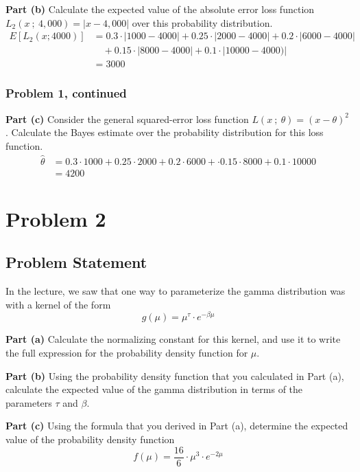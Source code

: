 \documentclass[12pt]{article}
\theoremstyle{definition}
\begin{document}
\vspace{1.5in}
\noindent
{\bf Part (b)} Calculate the expected value of the absolute error loss function $L_2(x\ ;\ 4,000) = |x - 4,000|$ over this probability distribution.
\begin{align*}
E[L_2(x;4000)] &= 0.3 \cdot |1000 - 4000| + 0.25 \cdot |2000 - 4000| + 0.2 \cdot |6000 - 4000|\\
&\quad + 0.15 \cdot |8000 - 4000| + 0.1 \cdot |10000 - 4000)|\\
&= 3000
\end{align*}

\newpage
\subsubsection*{Problem 1, continued}

\noindent
{\bf Part (c)} Consider the general squared-error loss function $L(x\ ;\ \theta) = (x - \theta)^2$. Calculate the Bayes estimate over the probability distribution for this loss function.
\begin{align*}
\hat{\theta} &= 0.3 \cdot 1000 + 0.25 \cdot 2000 + 0.2 \cdot 6000 + \cdot 0.15 \cdot 8000 + 0.1 \cdot 10000\\
&= 4200
\end{align*}

\newpage
\section*{Problem 2}

\subsection*{Problem Statement}

In the lecture, we saw that one way to parameterize the gamma distribution was with a kernel of the form
$$
g(\mu) = \mu^\tau \cdot e^{-\beta \mu}
$$

\bigskip
\noindent
{\bf Part (a)} Calculate the normalizing constant for this kernel, and use it to write the full expression for the probability density function for $\mu$.

\bigskip
\noindent
{\bf Part (b)} Using the probability density function that you calculated in Part (a), calculate the expected value of the gamma distribution in terms of the parameters $\tau$ and $\beta$.

\bigskip
\noindent
{\bf Part (c)} Using the formula that you derived in Part (a), determine the expected value of the probability density function
$$
f(\mu) = \frac{16}{6} \cdot \mu^3 \cdot e^{-2\mu}
$$
\end{document}
